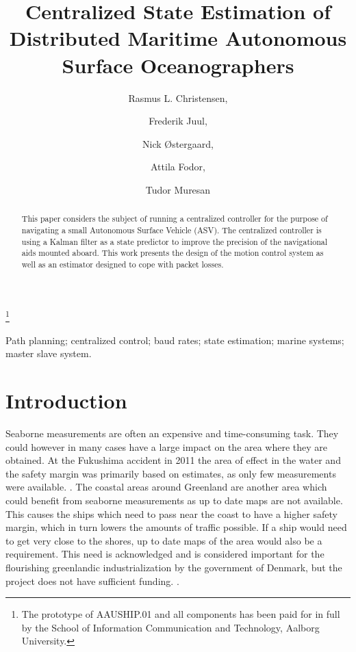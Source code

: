 \documentclass{ifacconf}
\begin{document}
\begin{frontmatter}

\title{Centralized State Estimation of Distributed Maritime Autonomous Surface Oceanographers} %

\thanks[footnoteinfo]{The prototype of AAUSHIP.01 and all components has been paid for in full by the School of Information Communication and Technology, Aalborg University.}

\author{Rasmus L. Christensen,} 
\author{Frederik Juul,} 
\author{Nick \O stergaard,}
\author{Attila Fodor,}
\author{Tudor Muresan}
\address{Section of Automation and Control, Department of Electronic Systems, Aalborg University, Fredrik Bajers Vej 7, 9220 Aalborg \O st, Denmark (e-mail: \{ralch,nickoe,fjuul,tmures12,afodor12\}@es.aau.dk)}                                            
          
\begin{keyword}                           %
Path planning; centralized control; baud rates; state estimation; marine systems; master slave system.              %
\end{keyword}                             %


\begin{abstract}                          %
This paper considers the subject of running a centralized controller for the purpose of navigating a small Autonomous Surface Vehicle (ASV). The centralized controller is using a Kalman filter as a state predictor to improve the precision of the navigational aids mounted aboard. This work presents the design of the motion control system as well as an estimator designed to cope with packet losses. 
\end{abstract}

\end{frontmatter}

\section{Introduction}
Seaborne measurements are often an expensive and time-consuming task. They could however in many cases have a large impact on the area where they are obtained. At the Fukushima accident in 2011 the area of effect in the water and the safety margin was primarily based on estimates, as only few measurements were available. \cite{energy}.
The coastal areas around Greenland are another area which could benefit from seaborne measurements as up to date maps are not available. This causes the ships which need to pass near the coast to have a higher safety margin, which in turn lowers the amounts of traffic possible. If a ship would need to get very close to the shores, up to date maps of the area would also be a requirement. This need is acknowledged and is considered important for the flourishing greenlandic industrialization by the government of Denmark, but the project does not have sufficient funding. \cite{engineer}.
\end{document}
